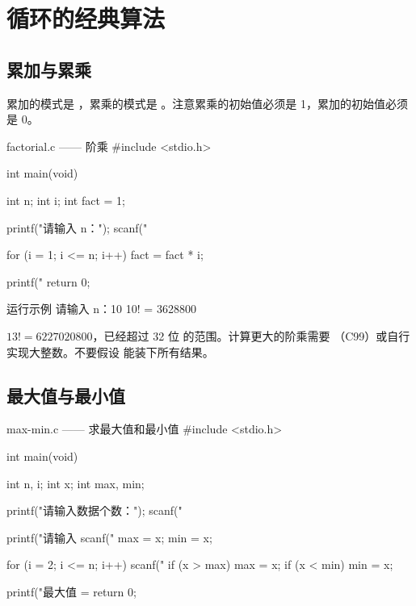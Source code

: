 \section{循环的经典算法}

\subsection{累加与累乘}

累加的模式是 ，累乘的模式是 。注意累乘的初始值必须是 1，累加的初始值必须是 0。

\begin{codebox}{factorial.c —— 阶乘}
#include <stdio.h>

int main(void)
{
    int n;
    int i;
    int fact = 1;

    printf("请输入 n：");
    scanf("%

    for (i = 1; i <= n; i++) {
        fact = fact * i;
    }

    printf("%
    return 0;
}
\end{codebox}

\begin{outbox}{运行示例}
请输入 n：10
10! = 3628800
\end{outbox}

\begin{pitfall}[阶乘增长极快]
$13! = 6227020800$，已经超过 32 位  的范围。计算更大的阶乘需要 （C99）或自行实现大整数。不要假设  能装下所有结果。
\end{pitfall}

\subsection{最大值与最小值}

\begin{codebox}{max-min.c —— 求最大值和最小值}
#include <stdio.h>

int main(void)
{
    int n, i;
    int x;
    int max, min;

    printf("请输入数据个数：");
    scanf("%

    printf("请输入 %
    scanf("%
    max = x;
    min = x;

    for (i = 2; i <= n; i++) {
        scanf("%
        if (x > max) {
            max = x;
        }
        if (x < min) {
            min = x;
        }
    }

    printf("最大值 = %
    return 0;
}
\end{codebox}

